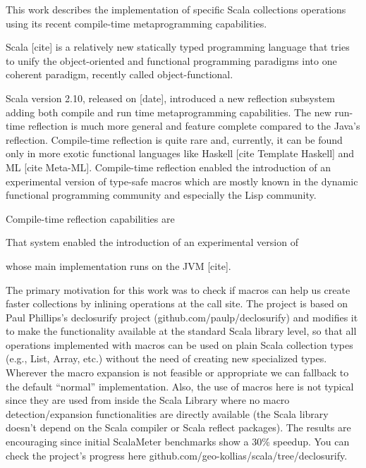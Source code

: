 This work describes the implementation of specific Scala collections operations using its recent compile-time metaprogramming capabilities.

Scala [cite] is a relatively new statically typed programming language that tries to unify the object-oriented and functional programming paradigms into one coherent paradigm, recently called object-functional. 

Scala version 2.10, released on [date], introduced a new reflection subsystem adding both compile and run time metaprogramming capabilities. The new run-time reflection is much more general and feature complete compared to the Java's reflection. Compile-time reflection is quite rare and, currently, it can be found only in more exotic functional languages like Haskell [cite Template Haskell] and ML [cite Meta-ML]. Compile-time reflection enabled the introduction of an experimental version of type-safe  macros  which are mostly known in the dynamic functional programming community and especially the Lisp community.

Compile-time reflection capabilities are 

That system enabled the introduction of an experimental version of 

whose main implementation runs on the JVM [cite]. 

The primary motivation for this work was to check if macros can help us create faster collections by inlining operations at the call site. The project is based on Paul Phillips’s declosurify project (github.com/paulp/declosurify) and modifies it to make the functionality available at the standard Scala library level, so that all operations implemented with macros can be used on plain Scala collection types (e.g., List, Array, etc.) without the need of creating new specialized types. Wherever the macro expansion is not feasible or appropriate we can fallback to the default “normal” implementation. Also, the use of macros here is not typical since they are used from inside the Scala Library where no macro detection/expansion functionalities are directly available (the Scala library doesn’t depend on the Scala compiler or Scala reflect packages). The results are encouraging since initial ScalaMeter benchmarks show a 30\% speedup. You can check the project’s progress here github.com/geo-kollias/scala/tree/declosurify.
